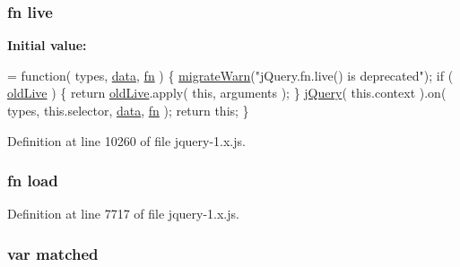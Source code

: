 \subsubsection[{\texorpdfstring{live}{live}}]{ {\bf fn} live}\hypertarget{jquery-1_8x_8js_ab8c156c437a408c01f80567143402f4b}{}\label{jquery-1_8x_8js_ab8c156c437a408c01f80567143402f4b}
{\bfseries Initial value\+:}
\begin{DoxyCode}
= \textcolor{keyword}{function}( types, \hyperlink{jquery-1_8x_8js_ad800f38c547e3a3ed2b14d23d10fc2b1}{data}, \hyperlink{jquery-1_8x_8min_8js_a37b9e1ceee4c6d2616fa6081784b5468}{fn} ) \{
    \hyperlink{jquery-1_8x_8js_ac6036b3100bb484f96bfb15165e077f9}{migrateWarn}(\textcolor{stringliteral}{"jQuery.fn.live() is deprecated"});
    \textcolor{keywordflow}{if} ( \hyperlink{jquery-1_8x_8js_aae143814bd850fc333932060b8af58c3}{oldLive} ) \{
        \textcolor{keywordflow}{return} \hyperlink{jquery-1_8x_8js_aae143814bd850fc333932060b8af58c3}{oldLive}.apply( \textcolor{keyword}{this}, arguments );
    \}
    \hyperlink{jquery-1_8x_8js_a2b1d6f9c448e3ce72f4e1865d6e38d2c}{jQuery}( this.context ).on( types, this.selector, \hyperlink{jquery-1_8x_8js_ad800f38c547e3a3ed2b14d23d10fc2b1}{data}, \hyperlink{jquery-1_8x_8min_8js_a37b9e1ceee4c6d2616fa6081784b5468}{fn} );
    \textcolor{keywordflow}{return} \textcolor{keyword}{this};
\}
\end{DoxyCode}


Definition at line 10260 of file jquery-\/1.\+x.\+js.

\subsubsection[{\texorpdfstring{load}{load}}]{ {\bf fn} load}\hypertarget{jquery-1_8x_8js_a8d0b9ec82c308161432f1c387d2fc2a7}{}\label{jquery-1_8x_8js_a8d0b9ec82c308161432f1c387d2fc2a7}


Definition at line 7717 of file jquery-\/1.\+x.\+js.

\subsubsection[{\texorpdfstring{matched}{matched}}]{\setlength{\rightskip}{0pt plus 5cm}var matched}\hypertarget{jquery-1_8x_8js_a19391c269840dbf5779055d4fe952b6d}{}\label{jquery-1_8x_8js_a19391c269840dbf5779055d4fe952b6d}


